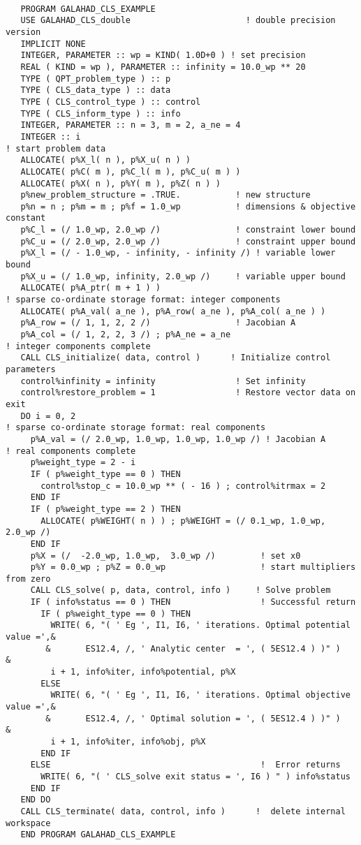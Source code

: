 \documentclass{galahad}
\begin{document}
{\tt \small
\begin{verbatim}
   PROGRAM GALAHAD_CLS_EXAMPLE
   USE GALAHAD_CLS_double                       ! double precision version
   IMPLICIT NONE
   INTEGER, PARAMETER :: wp = KIND( 1.0D+0 ) ! set precision
   REAL ( KIND = wp ), PARAMETER :: infinity = 10.0_wp ** 20
   TYPE ( QPT_problem_type ) :: p
   TYPE ( CLS_data_type ) :: data
   TYPE ( CLS_control_type ) :: control
   TYPE ( CLS_inform_type ) :: info
   INTEGER, PARAMETER :: n = 3, m = 2, a_ne = 4
   INTEGER :: i
! start problem data
   ALLOCATE( p%X_l( n ), p%X_u( n ) )
   ALLOCATE( p%C( m ), p%C_l( m ), p%C_u( m ) )
   ALLOCATE( p%X( n ), p%Y( m ), p%Z( n ) )
   p%new_problem_structure = .TRUE.           ! new structure
   p%n = n ; p%m = m ; p%f = 1.0_wp           ! dimensions & objective constant
   p%C_l = (/ 1.0_wp, 2.0_wp /)               ! constraint lower bound
   p%C_u = (/ 2.0_wp, 2.0_wp /)               ! constraint upper bound
   p%X_l = (/ - 1.0_wp, - infinity, - infinity /) ! variable lower bound
   p%X_u = (/ 1.0_wp, infinity, 2.0_wp /)     ! variable upper bound
   ALLOCATE( p%A_ptr( m + 1 ) )
! sparse co-ordinate storage format: integer components
   ALLOCATE( p%A_val( a_ne ), p%A_row( a_ne ), p%A_col( a_ne ) )
   p%A_row = (/ 1, 1, 2, 2 /)                 ! Jacobian A
   p%A_col = (/ 1, 2, 2, 3 /) ; p%A_ne = a_ne
! integer components complete
   CALL CLS_initialize( data, control )      ! Initialize control parameters
   control%infinity = infinity                ! Set infinity
   control%restore_problem = 1                ! Restore vector data on exit
   DO i = 0, 2
! sparse co-ordinate storage format: real components
     p%A_val = (/ 2.0_wp, 1.0_wp, 1.0_wp, 1.0_wp /) ! Jacobian A
! real components complete
     p%weight_type = 2 - i
     IF ( p%weight_type == 0 ) THEN
       control%stop_c = 10.0_wp ** ( - 16 ) ; control%itrmax = 2
     END IF
     IF ( p%weight_type == 2 ) THEN
       ALLOCATE( p%WEIGHT( n ) ) ; p%WEIGHT = (/ 0.1_wp, 1.0_wp, 2.0_wp /)
     END IF
     p%X = (/  -2.0_wp, 1.0_wp,  3.0_wp /)         ! set x0
     p%Y = 0.0_wp ; p%Z = 0.0_wp                   ! start multipliers from zero
     CALL CLS_solve( p, data, control, info )     ! Solve problem
     IF ( info%status == 0 ) THEN                  ! Successful return
       IF ( p%weight_type == 0 ) THEN
         WRITE( 6, "( ' Eg ', I1, I6, ' iterations. Optimal potential value =',&
        &       ES12.4, /, ' Analytic center  = ', ( 5ES12.4 ) )" )            &
         i + 1, info%iter, info%potential, p%X
       ELSE
         WRITE( 6, "( ' Eg ', I1, I6, ' iterations. Optimal objective value =',&
        &       ES12.4, /, ' Optimal solution = ', ( 5ES12.4 ) )" )            &
         i + 1, info%iter, info%obj, p%X
       END IF
     ELSE                                          !  Error returns
       WRITE( 6, "( ' CLS_solve exit status = ', I6 ) " ) info%status
     END IF
   END DO
   CALL CLS_terminate( data, control, info )      !  delete internal workspace
   END PROGRAM GALAHAD_CLS_EXAMPLE
\end{verbatim}
}
\end{document}
